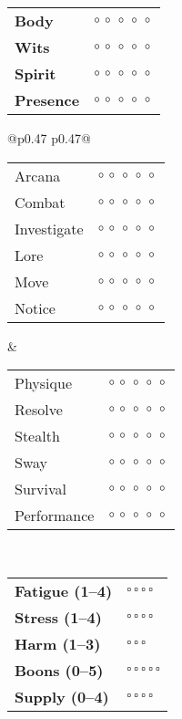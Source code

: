 \documentclass[10pt,letterpaper]{article}
\newcommand{\trackfive}{\normalsize$\circ\,\circ\,\circ\,\circ\,\circ$}
\newcommand{\trackfour}{\normalsize$\square\,\square\,\square\,\square$}
\begin{document}
\begin{paracol}{2}


\begin{tcolorbox}[sheetbox,title=\textbf{Attributes}]
\small
\begin{tabularx}{\columnwidth}{@{}l r@{}}
\textbf{Body} & \trackfive \\
\textbf{Wits} & \trackfive \\
\textbf{Spirit} & \trackfive \\
\textbf{Presence} & \trackfive \\
\end{tabularx}
\end{tcolorbox}

\begin{tcolorbox}[sheetbox,title=\textbf{Skills}]
\footnotesize
\begin{tabularx}{\columnwidth}{@{}p{0.47\columnwidth} p{0.47\columnwidth}@{}}
\begin{tabularx}{\linewidth}{@{}l r@{}}
Arcana & \trackfive \\
Combat & \trackfive \\
Investigate & \trackfive \\
Lore & \trackfive \\
Move & \trackfive \\
Notice & \trackfive \\
\end{tabularx}
&
\begin{tabularx}{\linewidth}{@{}l r@{}}
Physique & \trackfive \\
Resolve & \trackfive \\
Stealth & \trackfive \\
Sway & \trackfive \\
Survival & \trackfive \\
Performance & \trackfive \\
\end{tabularx}
\\
\end{tabularx}
\end{tcolorbox}

\begin{tcolorbox}[sheetbox,title=\textbf{Conditions \& Resources}]
\footnotesize
\begin{tabularx}{\columnwidth}{@{}l X@{}}
\textbf{Fatigue (1–4)} & \trackfour \\
\textbf{Stress (1–4)} & \trackfour \\
\textbf{Harm (1–3)} & $\square\,\square\,\square$ \\
\textbf{Boons (0–5)} & $\square\,\square\,\square\,\square\,\square$ \\
\textbf{Supply (0–4)} & \trackfour \\
\end{tabularx}


\end{tcolorbox}
\end{paracol}
\end{document}
